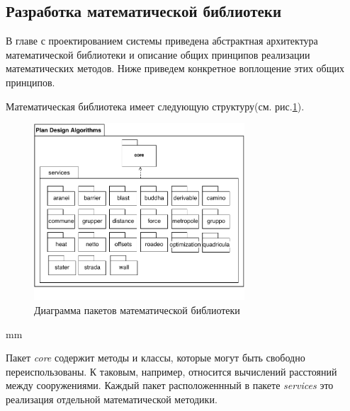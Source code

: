 \subsection{\large{Разработка математической библиотеки}}

В главе с проектированием системы приведена абстрактная архитектура математической библиотеки
и описание общих принципов реализации математических методов. Ниже приведем конкретное воплощение этих общих принципов.

Математическая библиотека имеет следующую структуру(см. рис.\ref{pic:implementation__math-packages}).

\begin{figure}[H]
	\includegraphics[width=0.7\textwidth]{implementation/pictures/math/packages}
	\caption{Диаграмма пакетов математической библиотеки}
	\label{pic:implementation__math-packages}
\end{figure}
 mm

Пакет \textit{core} содержит методы и классы, которые могут быть свободно переиспользованы.
К таковым, например, относится вычислений расстояний между сооружениями.
Каждый пакет расположеннный в пакете \textit{services} это реализация отдельной математической методики.

